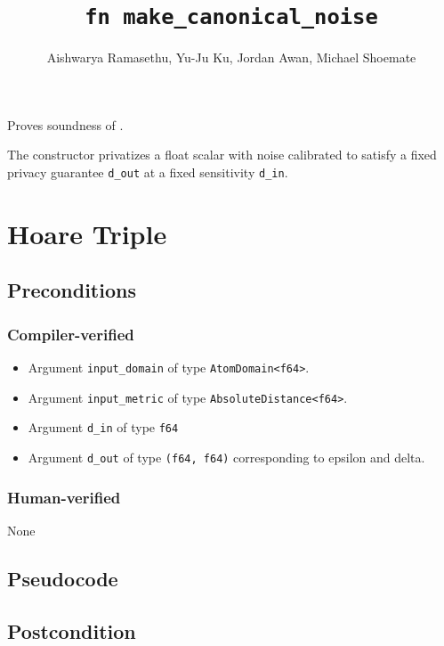 \documentclass{article}
\title{\texttt{fn make\_canonical\_noise}}
\author{Aishwarya Ramasethu, Yu-Ju Ku, Jordan Awan, Michael Shoemate}
\begin{document}
\maketitle

\contrib

Proves soundness of .

The constructor privatizes a float scalar with noise calibrated to satisfy 
a fixed privacy guarantee \texttt{d\_out} at a fixed sensitivity \texttt{d\_in}.

\section{Hoare Triple}

\subsection*{Preconditions}
\subsubsection*{Compiler-verified}
\begin{itemize}
    \item Argument \texttt{input\_domain} of type \texttt{AtomDomain<f64>}.
    \item Argument \texttt{input\_metric} of type \texttt{AbsoluteDistance<f64>}.
    \item Argument \texttt{d\_in} of type \texttt{f64}
    \item Argument \texttt{d\_out} of type \texttt{(f64, f64)} corresponding to epsilon and delta.
\end{itemize}

\subsubsection*{Human-verified}
None

\subsection*{Pseudocode}



\subsection*{Postcondition}
\end{document}

